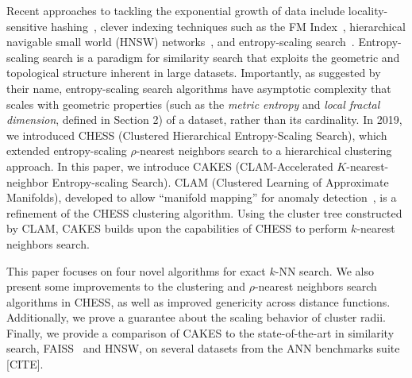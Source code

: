 Recent approaches to tackling the exponential growth of data include locality-sensitive hashing~\cite{indyk1999sublinear}, 
clever indexing techniques such as the FM Index~\cite{simpson2010efficient}, hierarchical navigable small world (HNSW) networks~\cite{Malkov2016EfficientAR}, and entropy-scaling search~\cite{yu2015entropy, ishaq2019clustered}. 
Entropy-scaling search is a paradigm for similarity search that exploits the geometric and topological structure inherent in large datasets.
Importantly, as suggested by their name, entropy-scaling search algorithms have asymptotic complexity that scales with geometric properties (such as the 
\emph{metric entropy} and \emph{local fractal dimension}, defined in Section 2) of a dataset,
rather than its cardinality. In 2019, we introduced CHESS (Clustered Hierarchical Entropy-Scaling Search), which extended entropy-scaling $\rho$-nearest 
neighbors search to a hierarchical clustering approach. In this paper, we introduce CAKES (CLAM-Accelerated $K$-nearest-neighbor 
Entropy-scaling Search). CLAM (Clustered Learning of Approximate Manifolds), developed to allow ``manifold mapping'' for anomaly detection~\cite{ishaq2021clustered}, is a refinement of the CHESS clustering algorithm. 
Using the cluster tree constructed by CLAM, CAKES builds upon the capabilities of CHESS to perform
$k$-nearest neighbors search. 


This paper focuses on four novel algorithms for exact $k$-NN search. We also present some 
improvements to the clustering and $\rho$-nearest neighbors search algorithms in CHESS, 
as well as improved genericity across distance functions. Additionally, we prove a guarantee about the scaling behavior of cluster radii. 
Finally, we provide a comparison of 
CAKES to the state-of-the-art in similarity search, FAISS~\cite{johnson2019billion} and HNSW, on several datasets 
from the ANN benchmarks suite [CITE].